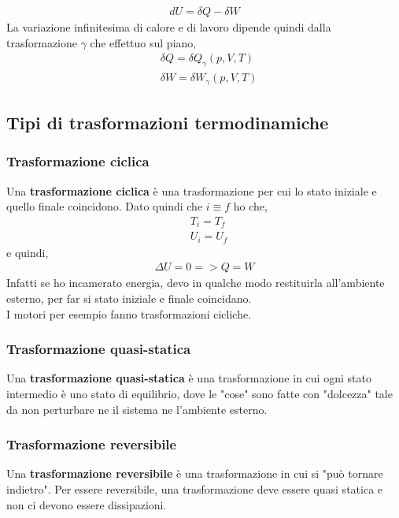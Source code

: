        \begin{align*}
            dU = \delta Q - \delta W
        \end{align*}
        La variazione infinitesima di calore e di lavoro dipende quindi dalla trasformazione $\gamma$ che effettuo sul piano,
        \begin{align*}
            &\delta Q = \delta Q_{\gamma}(p, V, T)\\
            &\delta W = \delta W_{\gamma}(p, V, T)
        \end{align*}

    \subsection{Tipi di trasformazioni termodinamiche}

        \subsubsection{Trasformazione ciclica}
            Una \textbf{trasformazione ciclica} è una trasformazione per cui lo stato iniziale e quello finale coincidono. Dato quindi che $i\equiv f$ ho che,
            \begin{align*}
                &T_i = T_f\\
                &U_i = U_f
            \end{align*}
            e quindi,
            \begin{align*}
                \Delta U = 0 => Q = W
            \end{align*}
            Infatti se ho incamerato energia, devo in qualche modo restituirla all'ambiente esterno, per far si stato iniziale e finale coincidano.\\
            I motori per esempio fanno trasformazioni cicliche.

        \subsubsection{Trasformazione quasi-statica}
            Una \textbf{trasformazione quasi-statica} è una trasformazione in cui ogni stato intermedio è uno stato di equilibrio, dove le "cose" sono fatte con "dolcezza" tale da non perturbare ne il sistema ne l'ambiente esterno.

        \subsubsection{Trasformazione reversibile}
            Una \textbf{trasformazione reversibile} è una trasformazione in cui si "può tornare indietro". Per essere reversibile, una trasformazione deve essere quasi statica e non ci devono essere dissipazioni.

